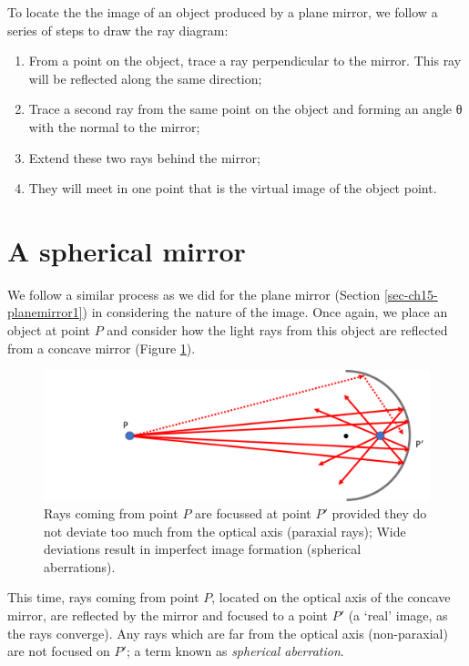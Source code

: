 \documentclass[
]{book}
\providecommand{\tightlist}{%
  \setlength{\itemsep}{0pt}\setlength{\parskip}{0pt}}
\begin{document}
To locate the the image of an object produced by a plane mirror, we follow a series of steps to draw the ray diagram:

\begin{enumerate}
\def\labelenumi{\arabic{enumi}.}
\tightlist
\item
  From a point on the object, trace a ray perpendicular to the mirror. This ray will be reflected along the same direction;
\item
  Trace a second ray from the same point on the object and forming an angle θ with the normal to the mirror;
\item
  Extend these two rays behind the mirror;
\item
  They will meet in one point that is the virtual image of the object point.
\end{enumerate}

\hypertarget{sec-ch15-sphericalmirror1}{%
\section{A spherical mirror}\label{sec-ch15-sphericalmirror1}}

We follow a similar process as we did for the plane mirror (Section \ref{sec-ch15-planemirror1}) in considering the nature of the image. Once again, we place an object at point \(P\) and consider how the light rays from this object are reflected from a concave mirror (Figure \ref{fig:ch15-sphericalconcave1}).\\

\begin{figure}

{\centering \includegraphics[width=0.7\linewidth]{visualisations/LaTeX/ch15-sphericalmirror1} 

}

\caption{Rays coming from point $P$ are focussed at point $P'$ provided they do not deviate too much from the optical axis (paraxial rays); Wide deviations result in imperfect image formation (spherical aberrations).}\label{fig:ch15-sphericalconcave1}
\end{figure}

This time, rays coming from point \(P\), located on the optical axis of the concave mirror, are reflected by the mirror and focused to a point \(P'\) (a `real' image, as the rays converge). Any rays which are far from the optical axis (non-paraxial) are not focused on \(P'\); a term known as \emph{spherical aberration}.
\end{document}
